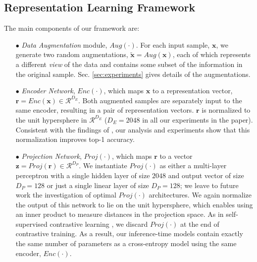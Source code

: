 \subsection{Representation Learning Framework}
The main components of our framework are:
\begin{itemize}[leftmargin=*]
  \item [$\bullet$] \emph{Data Augmentation} module, $Aug(\cdot)$. For each input sample, $\boldsymbol{x}$, we generate two random augmentations, $\boldsymbol{\tilde{x}} = Aug(\boldsymbol{x})$,  each of which represents a different \emph{view} of the data and contains some subset of the information in the original sample. Sec. \ref{sec:experiments} gives details of the augmentations.

  \item[$\bullet$] \emph{Encoder Network}, $Enc(\cdot)$, which maps $\boldsymbol{x}$ to a representation vector, $\boldsymbol{r}=Enc(\boldsymbol{x})\in\mathcal{R}^{D_E}$. Both augmented samples are separately input to the same encoder, resulting in a pair of representation vectors. $\boldsymbol{r}$ is normalized to the unit hypersphere in $\mathcal{R}^{D_E}$ ($D_E = 2048$ in all our experiments in the paper). Consistent with the findings of \cite{schroff2015facenet,wang2020understanding}, our analysis and experiments show that this normalization improves top-1 accuracy. %
  
  \item[$\bullet$] \emph{Projection Network}, $Proj(\cdot)$, which maps $\boldsymbol{r}$ to a vector $\boldsymbol{z}=Proj(\boldsymbol{r})\in\mathcal{R}^{D_P}$. We instantiate $Proj(\cdot)$ as either a multi-layer perceptron \cite{hastie2001statisticallearning} with a single hidden layer of size $2048$ and output vector of size $D_P=128$ or just a single linear layer of size $D_P=128$; we leave to future work the investigation of optimal $Proj(\cdot)$ architectures. We again normalize the output of this network to lie on the unit hypersphere, which enables using an inner product to measure distances in the projection space. As in self-supervised contrastive learning \cite{tian2019contrastive,chen2020simple}, we discard $Proj(\cdot)$ at the end of contrastive training. As a result, our inference-time models contain exactly the same number of parameters as a cross-entropy model using the same encoder, $Enc(\cdot)$. 
\end{itemize}

